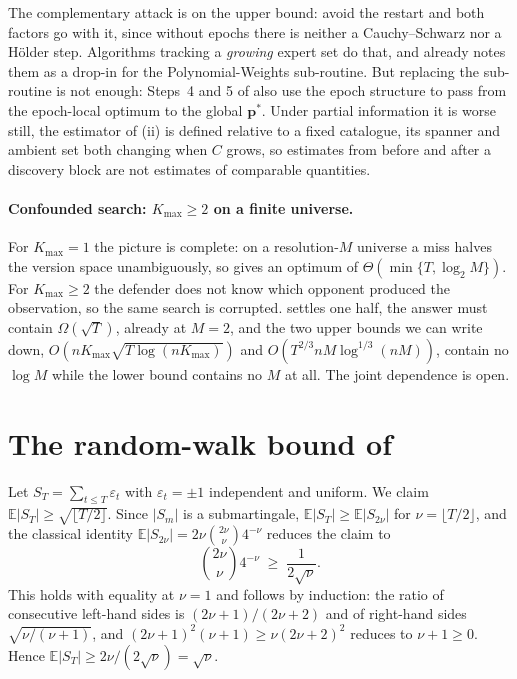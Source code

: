 \documentclass[letterpaper,9pt,twocolumn]{extarticle}
\newcommand{\pvec}{\mathbf{p}}
\newcommand{\EE}{\mathbb{E}}
\newcommand{\Kmax}{K_{\max}}
\theoremstyle{plain}
\theoremstyle{definition}
\theoremstyle{remark}
\begin{document}
The complementary attack is on the upper bound: avoid the restart and both
factors go with it, since without epochs there is neither a Cauchy--Schwarz
nor a H\"older step. Algorithms tracking a \emph{growing} expert set
\citep{mourtada2017} do that, and  already notes them as a
drop-in for the Polynomial-Weights sub-routine. But replacing the sub-routine
is not enough: Steps~4 and 5 of  also use the epoch structure
to pass from the epoch-local optimum to the global $\pvec^{*}$. Under partial
information it is worse still, the estimator of (ii) is
defined relative to a fixed catalogue, its spanner and ambient set both
changing when $C$ grows, so estimates from before and after a discovery block
are not estimates of comparable quantities.

\paragraph{Confounded search: $\Kmax\ge 2$ on a finite universe.}
For $\Kmax=1$ the picture is complete: on a resolution-$M$ universe a miss
halves the version space unambiguously, so  gives an
optimum of $\Theta(\min\{T,\log_2 M\})$. For $\Kmax\ge 2$ the defender does
not know which opponent produced the observation, so the same search is
corrupted.  settles one half, the answer must contain
$\Omega(\sqrt T)$, already at $M=2$, and the two upper bounds we can write
down, $O(n\Kmax\sqrt{T\log (n\Kmax)})$ and $O(T^{2/3}nM\log^{1/3}(nM))$,
contain no $\log M$ while the lower bound contains no $M$ at all. The joint
dependence is open.







\clearpage
\appendix
\section{The random-walk bound of }
\label{app:walk}

Let $S_T=\sum_{t\le T}\varepsilon_t$ with $\varepsilon_t=\pm1$ independent
and uniform. We claim $\EE|S_T|\ge\sqrt{\lfloor T/2\rfloor}$. Since $|S_m|$
is a submartingale, $\EE|S_T|\ge\EE|S_{2\nu}|$ for $\nu=\lfloor T/2\rfloor$,
and the classical identity $\EE|S_{2\nu}|=2\nu\binom{2\nu}{\nu}4^{-\nu}$
reduces the claim to
\begin{equation}
\binom{2\nu}{\nu}4^{-\nu}\;\ge\;\frac{1}{2\sqrt{\nu}} .
\label{eq:centralbinom}
\end{equation}
This holds with equality at $\nu=1$ and follows by induction: the ratio of
consecutive left-hand sides is $(2\nu+1)/(2\nu+2)$ and of right-hand sides
$\sqrt{\nu/(\nu+1)}$, and $(2\nu+1)^2(\nu+1)\ge\nu(2\nu+2)^2$ reduces to
$\nu+1\ge 0$. Hence $\EE|S_T|\ge 2\nu/(2\sqrt\nu)=\sqrt{\nu}$.
\end{document}
